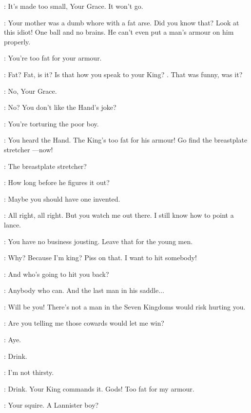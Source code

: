 
\LANCEL: It's made too small, Your Grace. It won't go. 

\ROBERT: Your mother was a dumb whore with a fat arse. Did you know that? Look at this idiot! One ball and no brains. He can't even put a man's armour on him properly. 

\NED: You're too fat for your armour. 

\ROBERT: Fat? Fat, is it? Is that how you speak to your
King? .  That was funny, was it? 

\LANCEL: No, Your Grace. 

\ROBERT: No? You don't like the Hand's joke? 

\NED: You're torturing the poor boy. 

\ROBERT: You heard the Hand. The King's too fat for his armour! Go find the breastplate stretcher ---now! 


\NED: The breastplate stretcher? 

\ROBERT: How long before he figures it out? 

\NED: Maybe you should have one invented. 

\ROBERT: All right, all right. But you watch me out there. I still know how to point a lance. 

\NED: You have no business jousting. Leave that for the young men. 

\ROBERT: Why? Because I'm king? Piss on that. I want to hit somebody! 

\NED: And who's going to hit you back? 

\ROBERT: Anybody who can. And the last man in his saddle$\ldots$

\NED: Will be you! There's not a man in the Seven Kingdoms would risk hurting you. 

\ROBERT: Are you telling me those cowards would let me win? 

\NED: Aye. 


\ROBERT:  Drink. 

\NED: I'm not thirsty. 

\ROBERT: Drink. Your King commands it. Gods! Too fat for my armour. 

\NED: Your squire. A Lannister boy? 

